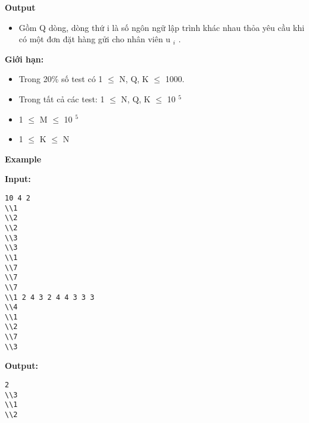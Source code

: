 \textbf{    Output   }
\begin{itemize}
	\item     Gồm Q dòng, dòng thứ i là số ngôn ngữ lập trình khác nhau thỏa yêu cầu khi có một đơn đặt hàng gửi cho nhân viên u    $_     i    $    .   
\end{itemize}

\textbf{    Giới hạn:   }
\begin{itemize}
	\item     Trong 20\% số test có 1  $\le$  N, Q, K       $\le$  1000.   
	\item     Trong tất cả các test: 1  $\le$  N, Q, K       $\le$  10    $^     5    $
	\item     1  $\le$  M  $\le$  10    $^     5    $
	\item     1  $\le$  K  $\le$  N   
\end{itemize}



\textbf{    Example   }

\textbf{    Input:   }
\begin{verbatim}
10 4 2
\\1
\\2
\\2
\\3
\\3
\\1
\\7
\\7
\\7
\\1 2 4 3 2 4 4 3 3 3
\\4
\\1
\\2
\\7
\\3\end{verbatim}

\textbf{    Output:   }
\begin{verbatim}
2
\\3
\\1
\\2\end{verbatim}
